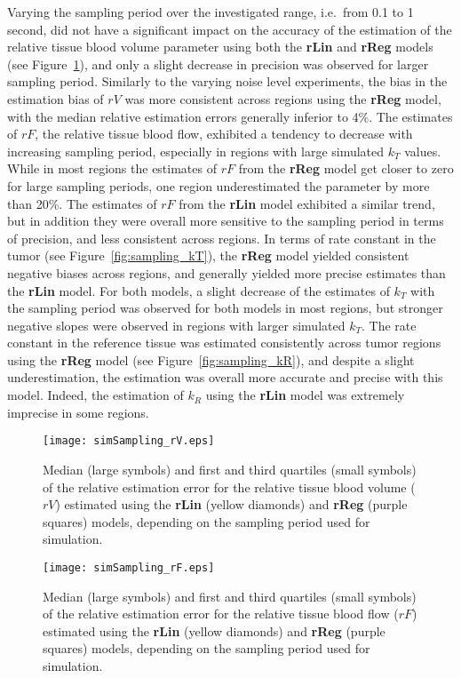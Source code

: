 Varying the sampling period over the investigated range, i.e.~from 0.1 to 1 second, did not have a significant impact on the accuracy of the estimation of the relative tissue blood volume parameter using both the \textbf{rLin} and \textbf{rReg} models (see Figure~\ref{fig:sampling_rV}), and only a slight decrease in precision was observed for larger sampling period.
Similarly to the varying noise level experiments, the bias in the estimation bias of $rV$ was more consistent across regions using the \textbf{rReg} model, with the median relative estimation errors generally inferior to 4\%.
The estimates of $rF$, the relative tissue blood flow, exhibited a tendency to decrease with increasing sampling period, especially in regions with large simulated $k_T$ values. 
While in most regions the estimates of $rF$ from the \textbf{rReg} model get closer to zero for large sampling periods, one region underestimated the parameter by more than 20\%.
The estimates of $rF$ from the \textbf{rLin} model exhibited a similar trend, but in addition they were overall more sensitive to the sampling period in terms of precision, and less consistent across regions.
In terms of rate constant in the tumor (see Figure~\ref{fig:sampling_kT}), the \textbf{rReg} model yielded consistent negative biases across regions, and generally yielded more precise estimates than the \textbf{rLin} model.
For both models, a slight decrease of the estimates of $k_T$ with the sampling period was observed for both models in most regions, but stronger negative slopes were observed in regions with larger simulated $k_T$.
The rate constant in the reference tissue was estimated consistently across tumor regions using the \textbf{rReg} model (see Figure~\ref{fig:sampling_kR}), and despite a slight underestimation, the estimation was overall more accurate and precise with this model.
Indeed, the estimation of $k_R$ using the \textbf{rLin} model was extremely imprecise in some regions.

\begin{figure}
\texttt{[image: simSampling\_rV.eps]}
\caption{Median (large symbols) and first and third quartiles (small symbols) of the relative estimation error for the relative tissue blood volume ($rV$) estimated using the \textbf{rLin} (yellow diamonds) and \textbf{rReg} (purple squares) models, depending on the sampling period used for simulation.}
\label{fig:sampling_rV}
\end{figure}

\begin{figure}
\texttt{[image: simSampling\_rF.eps]}
\caption{Median (large symbols) and first and third quartiles (small symbols) of the relative estimation error for the relative tissue blood flow ($rF$) estimated using the \textbf{rLin} (yellow diamonds) and \textbf{rReg} (purple squares) models, depending on the sampling period used for simulation.}
\label{fig:sampling_rF}
\end{figure}

